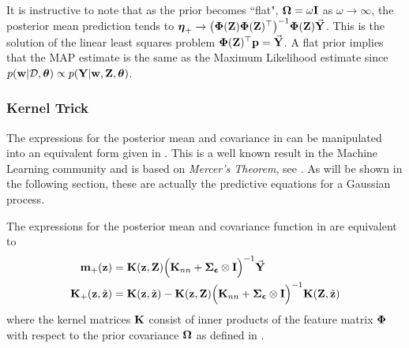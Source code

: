 It is instructive to note that as the prior becomes ``flat", $\boldsymbol{\Omega} =\omega\mathbf{I}$ as $\omega\rightarrow \infty$, the posterior mean prediction tends to $\boldsymbol{\eta}_+ \rightarrow \big(\boldsymbol{\Phi}(\mathbf{Z})\boldsymbol{\Phi}(\mathbf{Z})^\top\big)^{-1}\boldsymbol{\Phi}(\mathbf{Z})\vec{\mathbf{Y}}$. This is the solution of the linear least squares problem $\boldsymbol{\Phi}(\mathbf{Z})^\top\mathbf{p} = \vec{\mathbf{Y}}$. A flat prior implies that the MAP estimate is the same as the Maximum Likelihood estimate since $p(\mathbf{w}|\mathcal{D},\boldsymbol{\theta}) \propto p(\mathbf{Y}|\mathbf{w},\mathbf{Z},\boldsymbol{\theta})$.






\subsubsection{Kernel Trick} 
The expressions for the posterior mean and covariance in  can be manipulated into an equivalent form given in . This is a well known result in the Machine Learning community and is based on \textit{Mercer's Theorem}, see \cite{Mer1909}. As will be shown in the following section, these are actually the predictive equations for a Gaussian process. 

\begin{theo} \label{theo:kerneltrick}
%
The expressions for the posterior mean and covariance function in  are equivalent to 
\begin{align}
\mathbf{m}_{+}(\mathbf{z}) &= \mathbf{K}(\mathbf{z},\mathbf{Z}) \Big(\mathbf{K}_{nn}+\boldsymbol{\Sigma}_{\boldsymbol{\epsilon}}\otimes\mathbf{I}\Big)^{-1} \vec{\mathbf{Y}}  \label{eqn:rbfM2} \\
\mathbf{K}_{+}(\mathbf{z},\tilde{\mathbf{z}}) &= \mathbf{K}(\mathbf{z},\tilde{\mathbf{z}}) - 
\mathbf{K}(\mathbf{z},\mathbf{Z}) \Big(\mathbf{K}_{nn}+\boldsymbol{\Sigma}_{\boldsymbol{\epsilon}}\otimes\mathbf{I}\Big)^{-1}\mathbf{K}(\mathbf{Z},\tilde{\mathbf{z}}) \label{eqn:rbfV2}
\end{align}
where the kernel matrices $\mathbf{K}$ consist of inner products of the feature matrix $\boldsymbol{\Phi}$ with respect to the prior covariance $\boldsymbol{\Omega}$ as defined in .
%
\spa \end{theo}

